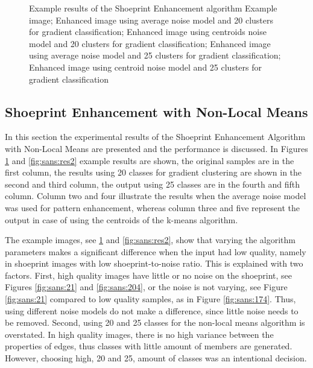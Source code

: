 \documentclass[draft,final]{vutinfth} %
\begin{document}
\begin{figure}[H]
\caption{Example results of the Shoeprint Enhancement algorithm
				 Example image;  Enhanced image using average noise model and 20 clusters for gradient classification;  Enhanced image using centroids noise model and 20 clusters for gradient classification;  Enhanced image using average noise model and 25 clusters for gradient classification;  Enhanced image using centroid noise model and 25 clusters for gradient classification}
\label{fig:sans:res1}

\end{figure}

\subsection{Shoeprint Enhancement with Non-Local Means}
\par
In this section the experimental results of the Shoeprint Enhancement Algorithm with Non-Local Means are presented and the performance is discussed.
In Figures \ref{fig:sans:res1} and \ref{fig:sans:res2} example results are shown, the original samples are in the first column, the results using 20 classes for gradient clustering are shown in the second and third column, the output using 25 classes are in the fourth and fifth column.
Column two and four illustrate the results when the average noise model was used for pattern enhancement, whereas column three and five represent the output in case of using the centroids of the k-means algorithm.
\par
The example images, see  \ref{fig:sans:res1} and \ref{fig:sans:res2}, show that varying the algorithm parameters makes a significant difference when the input had low quality, namely in shoeprint images with low shoeprint-to-noise ratio.
This is explained with two factors.
First, high quality images have little or no noise on the shoeprint, see Figures \ref{fig:sans:21} and \ref{fig:sans:204}, or the noise is not varying, see Figure \ref{fig:sans:21} compared to low quality samples, as in Figure \ref{fig:sans:174}.
Thus, using different noise models do not make a difference, since little noise needs to be removed.
Second, using 20 and 25 classes for the non-local means algorithm is overstated.
In high quality images, there is no high variance between the properties of edges, thus classes with little amount of members are generated.
However, choosing high, 20 and 25, amount of classes was an intentional decision.
\end{document}
